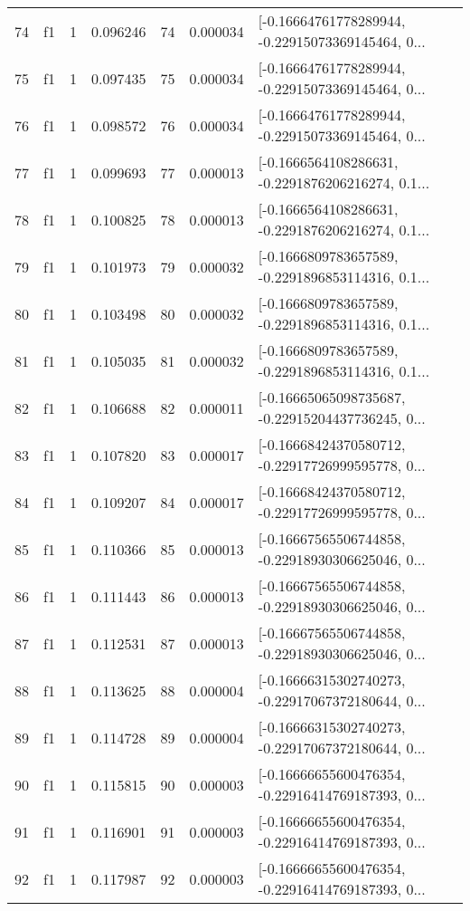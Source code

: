 \begin{tabular}{lllrlrl}
74  &  f1 &   1 &  0.096246 &   74 &  0.000034 &  [-0.16664761778289944, -0.22915073369145464, 0... \\
75  &  f1 &   1 &  0.097435 &   75 &  0.000034 &  [-0.16664761778289944, -0.22915073369145464, 0... \\
76  &  f1 &   1 &  0.098572 &   76 &  0.000034 &  [-0.16664761778289944, -0.22915073369145464, 0... \\
77  &  f1 &   1 &  0.099693 &   77 &  0.000013 &  [-0.1666564108286631, -0.2291876206216274, 0.1... \\
78  &  f1 &   1 &  0.100825 &   78 &  0.000013 &  [-0.1666564108286631, -0.2291876206216274, 0.1... \\
79  &  f1 &   1 &  0.101973 &   79 &  0.000032 &  [-0.1666809783657589, -0.2291896853114316, 0.1... \\
80  &  f1 &   1 &  0.103498 &   80 &  0.000032 &  [-0.1666809783657589, -0.2291896853114316, 0.1... \\
81  &  f1 &   1 &  0.105035 &   81 &  0.000032 &  [-0.1666809783657589, -0.2291896853114316, 0.1... \\
82  &  f1 &   1 &  0.106688 &   82 &  0.000011 &  [-0.16665065098735687, -0.22915204437736245, 0... \\
83  &  f1 &   1 &  0.107820 &   83 &  0.000017 &  [-0.16668424370580712, -0.22917726999595778, 0... \\
84  &  f1 &   1 &  0.109207 &   84 &  0.000017 &  [-0.16668424370580712, -0.22917726999595778, 0... \\
85  &  f1 &   1 &  0.110366 &   85 &  0.000013 &  [-0.16667565506744858, -0.22918930306625046, 0... \\
86  &  f1 &   1 &  0.111443 &   86 &  0.000013 &  [-0.16667565506744858, -0.22918930306625046, 0... \\
87  &  f1 &   1 &  0.112531 &   87 &  0.000013 &  [-0.16667565506744858, -0.22918930306625046, 0... \\
88  &  f1 &   1 &  0.113625 &   88 &  0.000004 &  [-0.16666315302740273, -0.22917067372180644, 0... \\
89  &  f1 &   1 &  0.114728 &   89 &  0.000004 &  [-0.16666315302740273, -0.22917067372180644, 0... \\
90  &  f1 &   1 &  0.115815 &   90 &  0.000003 &  [-0.16666655600476354, -0.22916414769187393, 0... \\
91  &  f1 &   1 &  0.116901 &   91 &  0.000003 &  [-0.16666655600476354, -0.22916414769187393, 0... \\
92  &  f1 &   1 &  0.117987 &   92 &  0.000003 &  [-0.16666655600476354, -0.22916414769187393, 0... \\

\end{tabular}
